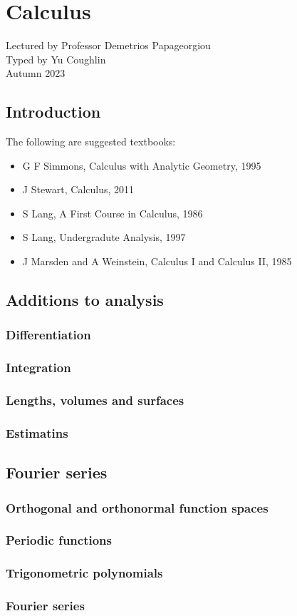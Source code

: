 \documentclass[../Year1/Year1.tex]{subfiles}
\begin{document}
\chapter{Calculus}
\renewcommand*\thesection{\arabic{section}}
Lectured by Professor Demetrios Papageorgiou \\ Typed by Yu Coughlin \\
Autumn 2023

\section*{Introduction}


The following are suggested textbooks:
\begin{itemize}
    \item G F Simmons, Calculus with Analytic Geometry, 1995
    \item J Stewart, Calculus, 2011
    \item S Lang, A First Course in Calculus, 1986
    \item S Lang, Undergradute Analysis, 1997
    \item J Marsden and A Weinstein, Calculus I and Calculus II, 1985
\end{itemize}

\tableofcontents\pagebreak

\section{Additions to analysis}
\subsection{Differentiation}
\subsection{Integration}
\subsection{Lengths, volumes and surfaces}
\subsection{Estimatins}

\section{Fourier series}
\subsection{Orthogonal and orthonormal function spaces}
\subsection{Periodic functions}
\subsection{Trigonometric polynomials}
\subsection{Fourier series}
\end{document}
